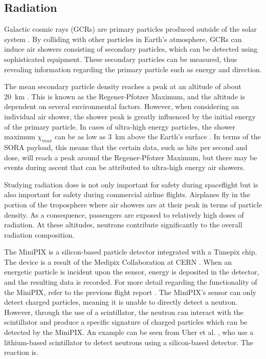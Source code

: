 \subsection{Radiation}
\label{sec: Radiation Background}

Galactic cosmic rays (GCRs) are primary particles produced outside of the solar system \cite{GCRs}.
By colliding with other particles in Earth's atmosphere, GCRs can induce air showers consisting of secondary particles, which can be detected using sophisticated equipment.
These secondary particles can be measured, thus revealing information regarding the primary particle such as energy and direction. 

The mean secondary particle density reaches a peak at an altitude of about \SI{20}{\kilo\meter} \cite{regener}.
This is known as the Regener-Pfotzer Maximum, and the altitude is dependent on several environmental factors.
However, when considering an individual air shower, the shower peak is greatly influenced by the initial energy of the primary particle.
In cases of ultra-high energy particles, the shower maximum $\chi _{max}$ can be as low as \SI{3}{\kilo\meter} above the Earth's surface \cite{Frank}.
In terms of the SORA payload, this means that the certain data, such as hits per second and dose, will reach a peak around the Regener-Pfotzer Maximum, but there may be events during ascent that can be attributed to ultra-high energy air showers.

Studying radiation dose is not only important for safety during spaceflight but is also important for safety during commercial airline flights.
Airplanes fly in the portion of the troposphere where air showers are at their peak in terms of particle density. As a consequence, passengers are exposed to relatively high doses of radiation.
At these altitudes, neutrons contribute significantly to the overall radiation composition.

The MiniPIX \cite{silicon_sensor} is a silicon-based particle detector integrated with a Timepix \cite{timepix} chip. The device is a result of the Medipix Collaboration at CERN \cite{medipix}. 
When an energetic particle is incident upon the sensor, energy is deposited in the detector, and the resulting data is recorded.
For more detail regarding the functionality of the MiniPIX, refer to the previous flight report \cite{SORA}.
The MiniPIX's sensor can only detect charged particles, meaning it is unable to directly detect a neutron. However, through the use of a scintillator, the neutron can interact with the scintillator and produce a specific signature of charged particles which can be detected by the MiniPIX.
An example can be seen from Uher et al. \cite{Uher}, who use a lithium-based scintillator to detect neutrons using a silicon-based detector. The reaction is.

